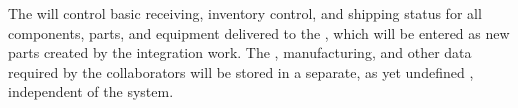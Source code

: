 The  will control basic receiving, inventory control, and shipping status for all components, parts, and equipment delivered to the , %
which will be entered  as new parts created by the integration work. The , %
 manufacturing, and other %
data required by the  collaborators will be stored in a separate, as yet undefined  %
, independent of the  system. 

